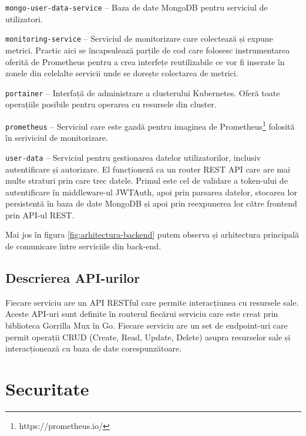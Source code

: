    \texttt{mongo-user-data-service} – Baza de date MongoDB pentru serviciul de utilizatori.
   
   \texttt{monitoring-service} – Serviciul de monitorizare care colectează și expune metrici. Practic aici se încapsulează
  parțile de cod care folosesc instrumentarea oferită de Prometheus pentru a crea interfețe reutilizabile ce vor fi inserate
  în zonele din celelalte servicii unde se dorește colectarea de metrici.
   
  \texttt{portainer} – Interfață de administrare a clusterului Kubernetes. Oferă toate operațiile posibile pentru
  operarea cu resursele din cluster.
   
  \texttt{prometheus} – Serviciul care este gazdă pentru imaginea de Prometheus\footnote{https://prometheus.io/} 
  folosită în seriviciul de monitorizare.
  
  \texttt{user-data} – Serviciul pentru gestionarea datelor utilizatorilor, 
  inclusiv autentificare și autorizare. El funcționeză ca un router REST API care are mai multe straturi prin care trec datele.
  Primul este cel de validare a token-ului de autentificare în middleware-ul JWTAuth, apoi prin parsarea datelor,
  stocarea lor persistentă în baza de date MongoDB și apoi prin reexpunerea lor către frontend prin API-ul REST.

Mai jos în figura \ref{fig:arhitectura-backend}
putem observa și arhitectura principală de comunicare între serviciile din back-end.


\subsection{Descrierea API-urilor}

Fiecare serviciu are un API RESTful care permite interacțiunea cu resursele sale.
Aceste API-uri sunt definite în routerul fiecărui serviciu care este creat prin biblioteca Gorrilla Mux în Go.
Fiecare serviciu are un set de endpoint-uri care permit operații CRUD (Create, Read, Update, Delete) asupra resurselor sale
și interacționează cu baza de date corespunzătoare.

\section{Securitate}


